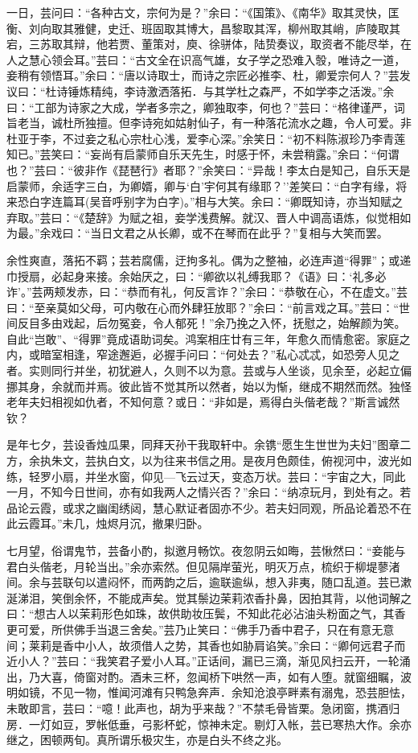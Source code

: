 \documentclass[]{article}
\begin{document}
一日，芸问曰：``各种古文，宗何为是？''余曰：``《国策》、《南华》取其灵快，匡衡、刘向取其雅健，史迁、班固取其博大，昌黎取其浑，柳州取其峭，庐陵取其宕，三苏取其辩，他若贾、董策对，庾、徐骈体，陆贽奏议，取资者不能尽举，在人之慧心领会耳。''芸曰：``古文全在识高气雄，女子学之恐难入彀，唯诗之一道，妾稍有领悟耳。''余曰：``唐以诗取士，而诗之宗匠必推李、杜，卿爱宗何人？''芸发议曰：``杜诗锤炼精纯，李诗激洒落拓．与其学杜之森严，不如学李之活泼。''余曰：``工部为诗家之大成，学者多宗之，卿独取李，何也？''芸曰：``格律谨严，词旨老当，诚杜所独擅。但李诗宛如姑射仙子，有一种落花流水之趣，令人可爱。非杜亚于李，不过妾之私心宗杜心浅，爱李心深。''余笑日：``初不料陈淑珍乃李青莲知已。''芸笑曰：``妄尚有启蒙师自乐天先生，时感于怀，未尝稍露。''余曰：``何谓也？''芸曰：``彼非作《琵琶行》者耶？''余笑曰：``异哉！李太白是知己，自乐天是启蒙师，余适字三白，为卿婿，卿与`白'宇何其有缘耶？''差笑曰：``白字有缘，将来恐白字连篇耳(吴音呼别字为白字)。''相与大笑。余曰：``卿既知诗，亦当知赋之弃取。''芸曰：``《楚辞》为赋之祖，妾学浅费解。就汉、晋人中调高语炼，似觉相如为最。''余戏曰：``当日文君之从长卿，或不在琴而在此乎？''复相与大笑而罢。

余性爽直，落拓不羁；芸若腐儒，迂拘多礼。偶为之整袖，必连声道``得罪''；或递巾授扇，必起身来接。余始厌之，曰：``卿欲以礼缚我耶？《语》曰：`礼多必诈'。''芸两颊发赤，曰：``恭而有礼，何反言诈？''余曰：``恭敬在心，不在虚文。''芸曰：``至亲莫如父母，可内敬在心而外肆狂放耶？''余曰：``前言戏之耳。''芸曰：``世间反目多由戏起，后勿冤妾，令人郁死！''余乃挽之入怀，抚慰之，始解颜为笑。自此``岂敢''、``得罪''竟成语助词矣。鸿案相庄廿有三年，年愈久而情愈密。家庭之内，或暗室相逢，窄途邂逅，必握手问曰：``何处去？''私心忒忒，如恐旁人见之者。实则同行并坐，初犹避人，久则不以为意。芸或与人坐谈，见余至，必起立偏挪其身，余就而并焉。彼此皆不觉其所以然者，始以为惭，继成不期然而然。独怪老年夫妇相视如仇者，不知何意？或日：``非如是，焉得白头偕老哉？''斯言诚然钦？

是年七夕，芸设香烛瓜果，同拜天孙干我取轩中。余镌``愿生生世世为夫妇''图章二方，余执朱文，芸执白文，以为往来书信之用。是夜月色颇佳，俯视河中，波光如练，轻罗小扇，并坐水窗，仰见---飞云过天，变态万状。芸曰：``宇宙之大，同此一月，不知今日世间，亦有如我两人之情兴否？''余曰：``纳凉玩月，到处有之。若品论云霞，或求之幽闺绣闼，慧心默证者固亦不少。若夫妇同观，所品论着恐不在此云霞耳。''未几，烛烬月沉，撤果归卧。

七月望，俗谓鬼节，芸备小酌，拟邀月畅饮。夜忽阴云如晦，芸愀然曰：``妾能与君白头偕老，月轮当出。''余亦索然。但见隔岸萤光，明灭万点，梳织于柳堤蓼渚间。余与芸联句以遣闷怀，而两韵之后，逾联逾纵，想入非夷，随口乱道。芸已漱涎涕泪，笑倒余怀，不能成声矣。觉其鬃边茉莉浓香扑鼻，因拍其背，以他词解之曰：``想古人以茉莉形色如珠，故供助妆压鬓，不知此花必沾油头粉面之气，其香更可爱，所供佛手当退三舍矣。''芸乃止笑曰：``佛手乃香中君子，只在有意无意间；莱莉是香中小人，故须借人之势，其香也如胁肩谄笑。''余曰：``卿何远君子而近小人？''芸曰：``我笑君子爱小人耳。''正话间，漏已三滴，渐见风扫云开，一轮涌出，乃大喜，倚窗对酌。酒未三杯，忽闻桥下哄然一声，如有人堕。就窗细瞩，波明如镜，不见一物，惟闻河滩有只鸭急奔声．余知沧浪亭畔素有溺鬼，恐芸胆怯，未敢即言，芸曰：``噫！此声也，胡为乎来哉？''不禁毛骨皆栗。急闭窗，携酒归房．一灯如豆，罗帐低垂，弓影杯蛇，惊神未定。剔灯入帐，芸已寒热大作。余亦继之，困顿两旬。真所谓乐极灾生，亦是白头不终之兆。
\end{document}
